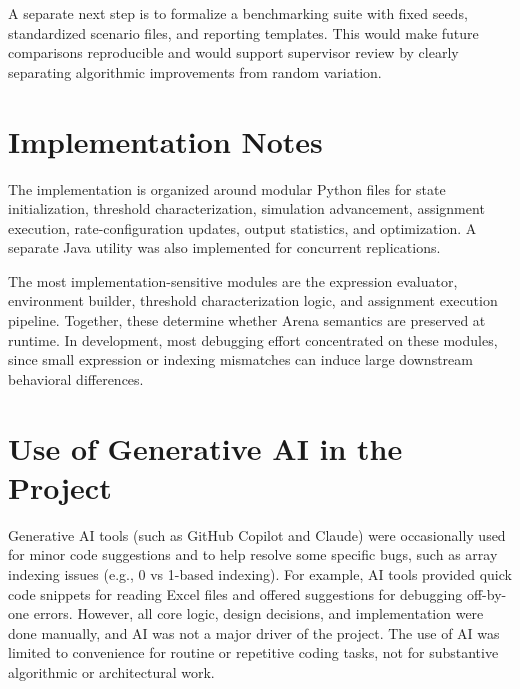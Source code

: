 \documentclass[11pt]{article}
\begin{document}
A separate next step is to formalize a benchmarking suite with fixed seeds, standardized scenario files, and reporting templates. This would make future comparisons reproducible and would support supervisor review by clearly separating algorithmic improvements from random variation.

\appendix

\section{Implementation Notes}
The implementation is organized around modular Python files for state initialization, threshold characterization, simulation advancement, assignment execution, rate-configuration updates, output statistics, and optimization. A separate Java utility was also implemented for concurrent replications.

The most implementation-sensitive modules are the expression evaluator, environment builder, threshold characterization logic, and assignment execution pipeline. Together, these determine whether Arena semantics are preserved at runtime. In development, most debugging effort concentrated on these modules, since small expression or indexing mismatches can induce large downstream behavioral differences.




\section{Use of Generative AI in the Project}
Generative AI tools (such as GitHub Copilot and Claude) were occasionally used for minor code suggestions and to help resolve some specific bugs, such as array indexing issues (e.g., 0 vs 1-based indexing). For example, AI tools provided quick code snippets for reading Excel files and offered suggestions for debugging off-by-one errors. However, all core logic, design decisions, and implementation were done manually, and AI was not a major driver of the project. The use of AI was limited to convenience for routine or repetitive coding tasks, not for substantive algorithmic or architectural work.
\end{document}
